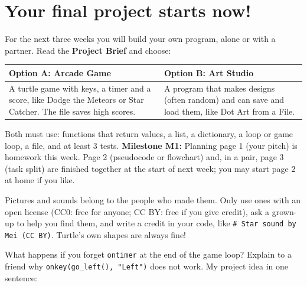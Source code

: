 \section{Your final project starts now!}
For the next three weeks you will build your own program, alone or with a partner. Read the \textbf{Project Brief} and choose:
\begin{center}
\renewcommand{\arraystretch}{1.3}
\begin{tabular}{@{}p{6.6cm}p{6.6cm}@{}}
\toprule
\textbf{Option A: Arcade Game} & \textbf{Option B: Art Studio} \\ \midrule
A turtle game with keys, a timer and a score, like Dodge the Meteors or Star Catcher. The file saves high scores. &
A program that makes designs (often random) and can save and load them, like Dot Art from a File. \\
\bottomrule
\end{tabular}
\end{center}
Both must use: functions that return values, a list, a dictionary, a loop or game loop, a file, and at least 3 tests.
\textbf{Milestone M1:} Planning page 1 (your pitch) is homework this week. Page 2 (pseudocode or flowchart) and, in a pair,
page 3 (task split) are finished together at the start of next week; you may start page 2 at home if you like.

\begin{tip}
Pictures and sounds belong to the people who made them. Only use ones with an open license (CC0: free for anyone; CC BY: free if you give credit),
ask a grown-up to help you find them, and write a credit in your code, like \texttt{\# Star sound by Mei (CC BY)}. Turtle's own shapes are always fine!
\end{tip}

\begin{vocab}
\end{vocab}

\begin{reflection}
What happens if you forget \texttt{ontimer} at the end of the game loop? 
Explain to a friend why \texttt{onkey(go\_left(), "Left")} does not work. 
My project idea in one sentence: 
\end{reflection}
